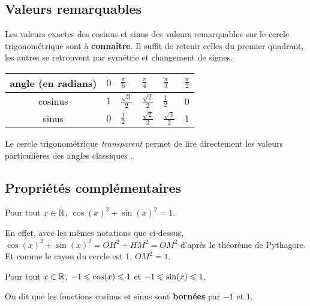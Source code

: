 \documentclass[a4paper,11pt]{article}
\begin{document}
\subsection{Valeurs remarquables}

\begin{cprop}
Les valeurs exactes des cosinus et sinus des valeurs remarquables sur le cercle trigonométrique sont à \textbf{connaître}. Il suffit de retenir celles du premier quadrant, les autres se retrouvent par symétrie et changement de signes.

\renewcommand{\arraystretch}{2.5}
\begin{center}
	\begin{tabularx}{10cm}{|c|Y|Y|Y|Y|Y|}
		\hline
		angle (en radians) & $0$ & $\frac{\pi}{6}$ & $\frac{\pi}{4}$ & $\frac{\pi}{3}$ & $\frac{\pi}{2}$ \\ 
		\hline
		cosinus & $1$ & $\frac{\sqrt{3}}{2}$ & $\frac{\sqrt{2}}{2}$ & $\frac{1}{2}$ & 0 \\ 
		\hline
		sinus & $0$ & $\frac{1}{2}$ & $\frac{\sqrt{2}}{2}$ & $\frac{\sqrt{3}}{2}$ & 1 \\ 
		\hline
	\end{tabularx}
\end{center}
\end{cprop}

\begin{crmq}
Le cercle trigonométrique \textit{transparent} permet de lire directement les valeurs particulières des angles \og classiques \fg.
\end{crmq}


\subsection{Propriétés complémentaires}

\begin{cprop}
Pour tout $x \in \R$, $\cos(x)^2+\sin(x)^2=1$.
\end{cprop}

\begin{cdemoblanc}
En effet, avec les mêmes notations que ci-dessus, $\cos(x)^2+\sin(x)^2=OH^2+HM^2=OM^2$ d'après le théorème de Pythagore. Et comme le rayon du cercle est 1, $OM^2=1$.
\end{cdemoblanc}

\begin{cprop}
Pour tout $x \in \R$, $-1 \leqslant \cos(x) \leqslant 1$ et $-1 \leqslant \sin(x) \leqslant 1$.

On dit que les fonctions cosinus et sinus sont \textbf{bornées} par $-1$ et $1$.
\end{cprop}	
\end{document}
